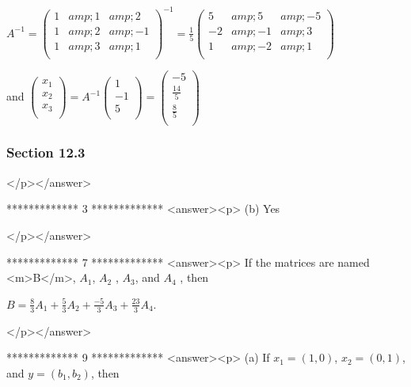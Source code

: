 \(A^{-1}=\left(
\begin{array}{ccc}
 1 &amp; 1 &amp; 2 \\
 1 &amp; 2 &amp; -1 \\
 1 &amp; 3 &amp; 1 \\
\end{array}
\right)^{-1}=\frac{1}{5}\left(
\begin{array}{ccc}
 5 &amp; 5 &amp; -5 \\
 -2 &amp; -1 &amp; 3 \\
 1 &amp; -2 &amp; 1 \\
\end{array}
\right)\)



and   \(\left(
\begin{array}{c}
 x_1 \\
 x_2 \\
 x_3 \\
\end{array}
\right)=A^{-1}\left(
\begin{array}{c}
 1 \\
 -1 \\
 5 \\
\end{array}
\right)=\left(
\begin{array}{c}
 -5 \\
 \frac{14}{5} \\
 \frac{8}{5} \\
\end{array}
\right)\)


\subsubsection{Section 12.3}

</p></answer>


*************
3
*************
<answer><p> (b) Yes

</p></answer>


*************
7
*************
<answer><p>  If the matrices are named <m>B</m>, \(A_1\), \(A_2\) , \(A_3\), and \(A_4\) , then



\(B = \frac{8}{3}A_1 + \frac{5}{3}A_2+\frac{-5}{3}A_3+\frac{23}{3}A_4\).

</p></answer>


*************
9
*************
<answer><p> (a) If \(x_1 = (1, 0)\), \(x_2= (0, 1)\), and \(y = \left(b_1, b_2\right)\), then 



